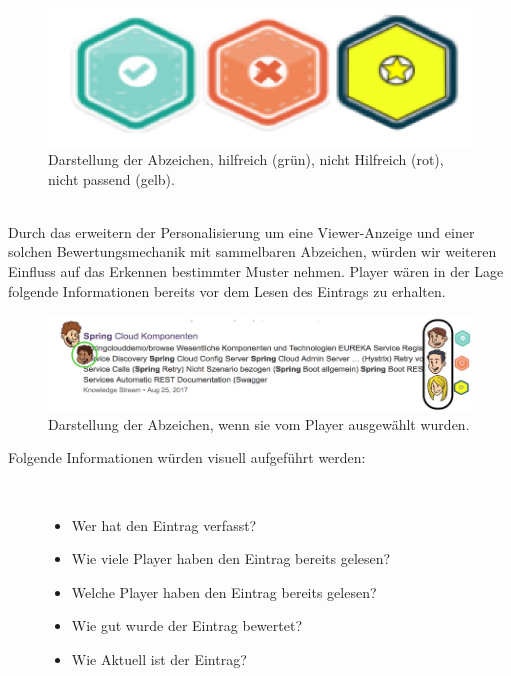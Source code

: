 \documentclass[a4paper,12pt,twoside]{scrartcl}
\begin{document}
\begin{figure}[h!]
\begin{center}
\includegraphics[scale = 0.5]{Bilder/NurBadges.png}
\caption{Darstellung der Abzeichen, hilfreich (grün), nicht Hilfreich (rot), nicht passend (gelb).}
\label{OnlyBadges}
\end{center}
\end{figure} 
\\
Durch das erweitern der Personalisierung um eine Viewer-Anzeige und einer solchen Bewertungsmechanik mit sammelbaren Abzeichen, würden wir weiteren Einfluss auf das Erkennen bestimmter Muster nehmen. Player wären in der Lage folgende Informationen bereits vor dem Lesen des Eintrags zu erhalten.
\\
\begin{figure}[h!]
\begin{center}
\includegraphics[scale = 0.5]{Bilder/NeueSuchErgebnisseSupporterBadges.png}
\caption{Darstellung der Abzeichen, wenn sie vom Player ausgewählt wurden.}
\label{NeueSuchErgebnisseSupporterBadges}
\end{center}
\end{figure} 
\begin{description}
   \item[Folgende Informationen würden visuell aufgeführt werden:]~\par
   \begin{itemize}
      \item Wer hat den Eintrag verfasst?
      \item Wie viele Player haben den Eintrag bereits gelesen?
      \item Welche Player haben den Eintrag bereits gelesen?
      \item Wie gut wurde der Eintrag bewertet?
      \item Wie Aktuell ist der Eintrag?
   \end{itemize}
\end{description} 
\end{document}
